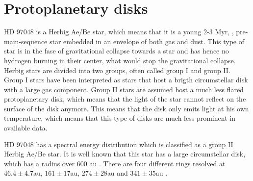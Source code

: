 \documentclass[twoside,single]{lion-msc}
\begin{document}
\section{Protoplanetary disks}
HD 97048 is a Herbig Ae/Be star, which means that it is a young 2-3 Myr, \cite{VanDenAncker1998}, pre-main-sequence star embedded in an envelope of both gas and dust. This type of star is in the fase of gravitational collapse towards a star and has hence no hydrogen burning in their center, what would stop the gravitational collapse. Herbig stars are divided into two groups, often called group I and group II. Group I stars have been interpreted as stars that host a brigth circumstellar disk with a large gas component. Group II stars are assumed host a much less flared protoplanetary disk, which means that the light of the star cannot reflect on the surface of the disk anymore. This means that the disk only emits light at his own temperature, which means that this type of disks are much less prominent in available data.
\bigskip 

HD 97048 has a spectral energy distribution which is classified as a group II Herbig Ae/Be star. It is well known that this star has a large circumstellar disk, which has a radius over 600 au \cite{Doering2007}. There are four different rings resolved at $46.4\pm 4.7$au, $161\pm 17$au,	$274\pm 28$au and $341\pm 35$au \cite{Ginski2016}.





\end{document}
